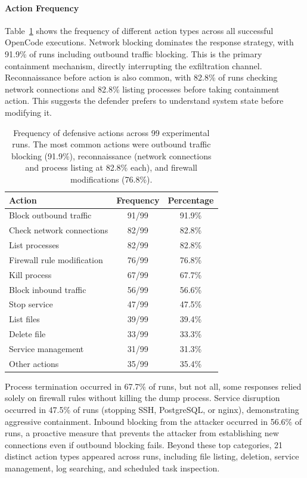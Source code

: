\paragraph{Action Frequency}

Table~\ref{tab:action_freq} shows the frequency of different action types across all successful OpenCode executions. Network blocking dominates the response strategy, with 91.9\% of runs including outbound traffic blocking. This is the primary containment mechanism, directly interrupting the exfiltration channel. Reconnaissance before action is also common, with 82.8\% of runs checking network connections and 82.8\% listing processes before taking containment action. This suggests the defender prefers to understand system state before modifying it.

\begin{table}[H]
    \centering
    \caption{Frequency of defensive actions across 99 experimental runs. The most common actions were outbound traffic blocking (91.9\%), reconnaissance (network connections and process listing at 82.8\% each), and firewall modifications (76.8\%).}
    \label{tab:action_freq}
    \begin{tabular}{lcc}
        \toprule
        \textbf{Action} & \textbf{Frequency} & \textbf{Percentage} \\
        \midrule
        Block outbound traffic & 91/99 & 91.9\% \\
        Check network connections & 82/99 & 82.8\% \\
        List processes & 82/99 & 82.8\% \\
        Firewall rule modification & 76/99 & 76.8\% \\
        Kill process & 67/99 & 67.7\% \\
        Block inbound traffic & 56/99 & 56.6\% \\
        Stop service & 47/99 & 47.5\% \\
        List files & 39/99 & 39.4\% \\
        Delete file & 33/99 & 33.3\% \\
        Service management & 31/99 & 31.3\% \\
        Other actions & 35/99 & 35.4\% \\
        \bottomrule
    \end{tabular}
\end{table}

Process termination occurred in 67.7\% of runs, but not all, some responses relied solely on firewall rules without killing the dump process. Service disruption occurred in 47.5\% of runs (stopping SSH, PostgreSQL, or nginx), demonstrating aggressive containment. Inbound blocking from the attacker occurred in 56.6\% of runs, a proactive measure that prevents the attacker from establishing new connections even if outbound blocking fails. Beyond these top categories, 21 distinct action types appeared across runs, including file listing, deletion, service management, log searching, and scheduled task inspection.

